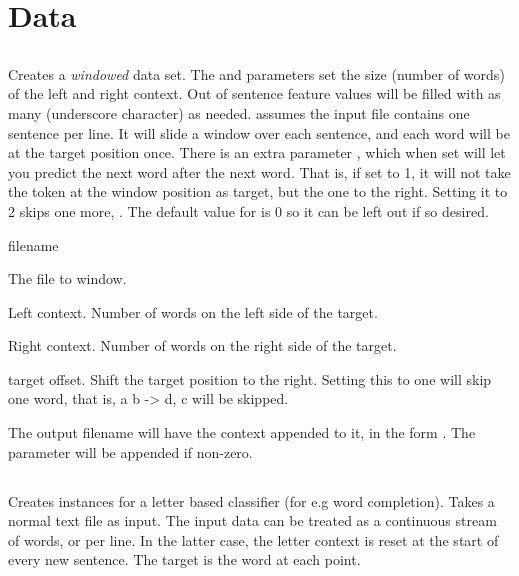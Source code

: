 \documentclass[a4paper,10pt,twoside]{report}
\begin{document}
\section{Data}

\subsection{}

Creates a \emph{windowed} data set. The  and 
parameters set the size (number of words) of the left and right
context. Out of sentence feature values will be filled with as many
\cmp{\_} (underscore character) as needed. \Wopr{} assumes the input
file contains one sentence per line. It will slide a window over each
sentence, and each word will be at the target position once. There is
an extra parameter , which when set will let you predict the
next word after the next word. That is, if set to \num{1}, it will not
take the token at the window position as target, but the one to the
right. Setting it to \num{2} skips one more, \etc{}. The default value
for  is 0 so it can be left out if so desired.

\begin{varlist}{filename}
\item[filename] The file to window.
\item[lc] Left context. Number of words on the left side of the target.
\item[rc] Right context. Number of words on the right side of the target.
\item[to] target offset. Shift the target position to the right. Setting this to
  one will skip one word, that is, a b -> d, c will be skipped.
\end{varlist}

The output filename will have the context appended to it, in the form
. The  parameter will be appended if non-zero.

\subsection{}

Creates instances for a letter based classifier (for e.g word completion). Takes
a normal text file as input. The input data can be treated as a continuous
stream of words, or per line. In the latter case, the letter context is reset at
the start of every new sentence. The target is the  word at each
point.
\end{document}
